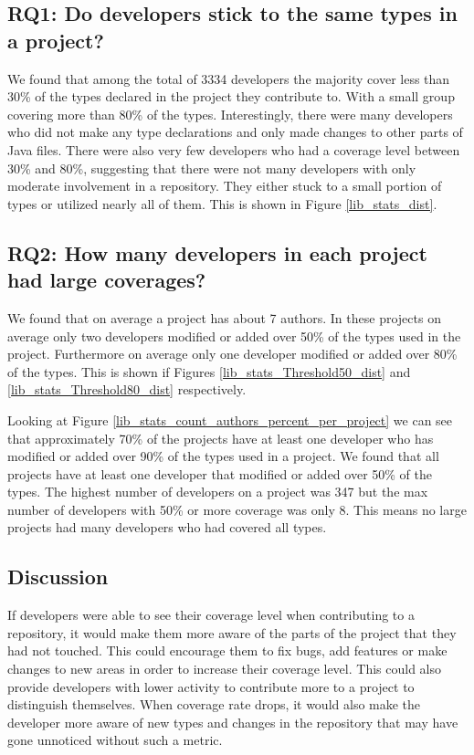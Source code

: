 \documentclass{sig-alternate-05-2015}
\begin{document}
\subsection{RQ1: Do developers stick to the same types in a project?}
We found that among the total of 3334 developers the majority cover less than 30\% of the types declared in the project they contribute to. With a small group covering more than 80\% of the types. Interestingly, there were many developers who did not make any type declarations and only made changes to other parts of Java files. There were also very few developers who had a coverage level between 30\% and 80\%, suggesting that there were not many developers with only moderate involvement in a repository. They either stuck to a small portion of types or utilized nearly all of them. This is shown in Figure \ref{lib_stats_dist}.

\subsection{RQ2: How many developers in each project had large coverages?}
We found that on average a project has about 7 authors. In these projects on average only two developers modified or added over 50\% of the types used in the project. Furthermore on average only one developer modified or added over 80\% of the types. This is shown if Figures \ref{lib_stats_Threshold50_dist} and \ref{lib_stats_Threshold80_dist} respectively. 

Looking at Figure \ref{lib_stats_count_authors_percent_per_project} we can see that approximately 70\% of the projects have at least one developer who has modified or added over 90\% of the types used in a project. We found that all projects have at least one developer that modified or added over 50\% of the types. The highest number of developers on a project was 347 but the max number of developers with 50\% or more coverage was only 8. This means no large projects had many developers who had covered all types.

\subsection{Discussion}
If developers were able to see their coverage level when contributing to a repository, it would make them more aware of the parts of the project that they had not touched. This could encourage them to fix bugs, add features or make changes to new areas in order to increase their coverage level. This could also provide developers with lower activity to contribute more to a project to distinguish themselves. When coverage rate drops, it would also make the developer more aware of new types and changes in the repository that may have gone unnoticed without such a metric.
\end{document}
